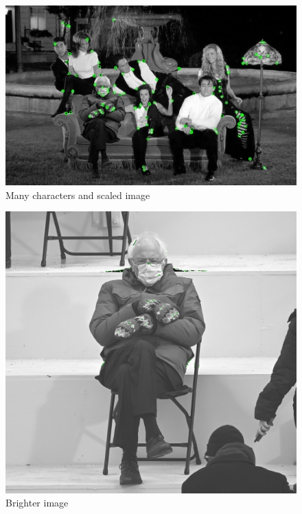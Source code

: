 \documentclass[12pt,a4paper]{report}
\begin{document}
\begin{figure}[hb]
	\centering
	\includegraphics[width=\textwidth]{BernieFriends.png_keypoints}
	\caption{Many characters and scaled image}
\end{figure}
\begin{figure}[hb]
	\centering
	\includegraphics[width=\textwidth]{brighterBernie.jpg_keypoints}
	\caption{Brighter image}
\end{figure}
\end{document}
